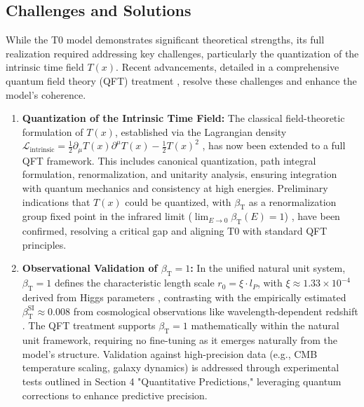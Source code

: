 \documentclass[twocolumn,aps,prl]{revtex4-2}
\newcommand{\Tfield}{T(x)}
\newcommand{\betaT}{\beta_{\text{T}}}
\newcommand{\calL}{\mathcal{L}}
\begin{document}
	\subsection{Challenges and Solutions}
	\label{subsec:challenges}
	
	While the T0 model demonstrates significant theoretical strengths, its full realization required addressing key challenges, particularly the quantization of the intrinsic time field \(\Tfield\). Recent advancements, detailed in a comprehensive quantum field theory (QFT) treatment \cite{pascher_qft_2025}, resolve these challenges and enhance the model’s coherence.
	
	\begin{enumerate}
		\item \textbf{Quantization of the Intrinsic Time Field:} The classical field-theoretic formulation of \(\Tfield\), established via the Lagrangian density \(\calL_{\text{intrinsic}} = \frac{1}{2}\partial_{\mu}\Tfield\partial^{\mu}\Tfield - \frac{1}{2}\Tfield^2\) \cite{pascher_lagrange_2025}, has now been extended to a full QFT framework. This includes canonical quantization, path integral formulation, renormalization, and unitarity analysis, ensuring integration with quantum mechanics and consistency at high energies. Preliminary indications that \(\Tfield\) could be quantized, with \(\betaT\) as a renormalization group fixed point in the infrared limit (\(\lim_{E \to 0} \betaT(E) = 1\)) \cite{pascher_alphabeta_2025}, have been confirmed, resolving a critical gap and aligning T0 with standard QFT principles.
		
		\item \textbf{Observational Validation of \(\betaT = 1\):} In the unified natural unit system, \(\betaT = 1\) defines the characteristic length scale \(r_0 = \xi \cdot l_P\), with \(\xi \approx 1.33 \times 10^{-4}\) derived from Higgs parameters \cite{pascher_params_2025, pascher_alphabeta_2025}, contrasting with the empirically estimated \(\betaT^{\text{SI}} \approx 0.008\) from cosmological observations like wavelength-dependent redshift \cite{pascher_messdifferenzen_2025}. The QFT treatment supports \(\betaT = 1\) mathematically within the natural unit framework, requiring no fine-tuning as it emerges naturally from the model’s structure. Validation against high-precision data (e.g., CMB temperature scaling, galaxy dynamics) is addressed through experimental tests outlined in Section 4 "Quantitative Predictions," leveraging quantum corrections to enhance predictive precision.
	\end{enumerate}
	
\end{document}
